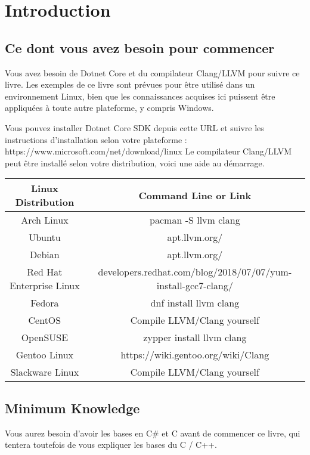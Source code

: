 \chapter{Introduction}
\section{Ce dont vous avez besoin pour commencer}
Vous avez besoin de Dotnet Core et du compilateur Clang/LLVM pour suivre ce livre. Les exemples de ce livre sont prévues pour être utilisé dans un environnement Linux, bien que les connaissances acquises ici puissent être appliquées à toute autre plateforme, y compris Windows.

Vous pouvez installer Dotnet Core SDK depuis cette URL et suivre les instructions d'installation selon votre plateforme :
\newline \newline
 https://www.microsoft.com/net/download/linux
\newline \newline
Le compilateur Clang/LLVM peut être installé selon votre distribution, voici une aide au démarrage.
\newline \newline
\begin{tabular}{| c | c |}
	\hline 
	\textbf{Linux Distribution} & \textbf{Command Line or Link} \\
	\hline
	 Arch Linux & pacman -S llvm clang  \\
	 \hline
	 Ubuntu & apt.llvm.org/ \\
	 \hline
	 Debian & apt.llvm.org/ \\
	 \hline
	 Red Hat Enterprise Linux & developers.redhat.com/blog/2018/07/07/yum-install-gcc7-clang/ \\
	 \hline
	 Fedora & dnf install llvm clang \\
	 \hline
	 CentOS & Compile LLVM/Clang yourself  \shrug \\
	 \hline
	 OpenSUSE & zypper install llvm clang \\
	 \hline
	 Gentoo Linux & https://wiki.gentoo.org/wiki/Clang \\
	 \hline
	 Slackware Linux & Compile LLVM/Clang yourself  \shrug \\
	 \hline
\end{tabular}

\section{Minimum Knowledge}
Vous aurez besoin d'avoir les bases en C# et C avant de commencer ce livre, qui tentera toutefois de vous expliquer les bases du C / C++.